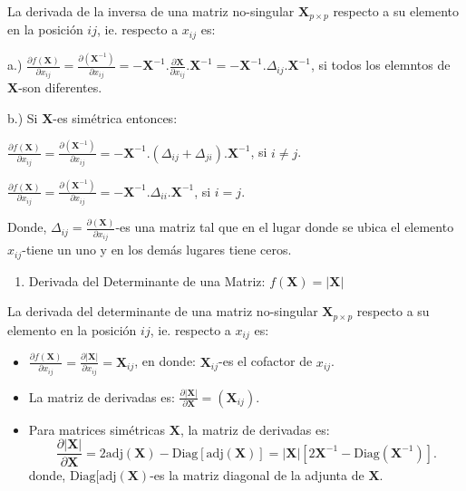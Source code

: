 \documentclass[
]{book}
\providecommand{\tightlist}{%
  \setlength{\itemsep}{0pt}\setlength{\parskip}{0pt}}
\theoremstyle{definition}
\theoremstyle{definition}
\theoremstyle{definition}
\theoremstyle{definition}
\theoremstyle{remark}
\begin{document}
La derivada de la inversa de una matriz no-singular \(\mathbf{X}_{p\times p}\) respecto a su elemento en la posición \(ij\), ie. respecto a \(x_{ij}\) es:

a.) \(\frac{\partial f(\mathbf{X})}{\partial x_{ij}}=\frac{\partial (\mathbf{X}^{-1})}{\partial x_{ij}}=-\mathbf{X}^{-1}.\frac{\partial \mathbf{X}}{\partial x_{ij}}. \mathbf{X}^{-1}=-\mathbf{X}^{-1}.\Delta_{ij}. \mathbf{X}^{-1}\), si todos los elemntos de \(\mathbf{X}\)-son diferentes.

b.) Si \(\mathbf{X}\)-es simétrica entonces:

\(\frac{\partial f(\mathbf{X})}{\partial x_{ij}}=\frac{\partial (\mathbf{X}^{-1})}{\partial x_{ij}}=-\mathbf{X}^{-1}.(\Delta_{ij}+\Delta_{ji}). \mathbf{X}^{-1}\), si \(i\neq j\).

\(\frac{\partial f(\mathbf{X})}{\partial x_{ij}}=\frac{\partial (\mathbf{X}^{-1})}{\partial x_{ij}}=-\mathbf{X}^{-1}.\Delta_{ii}. \mathbf{X}^{-1}\), si \(i= j\).

Donde, \(\Delta_{ij}=\frac{\partial (\mathbf{X})}{\partial x_{ij}}\)-es una matriz tal que en el lugar donde se ubica el elemento \(x_{ij}\)-tiene un uno y en los demás lugares tiene ceros.

\begin{enumerate}
\def\labelenumi{\arabic{enumi}.}
\setcounter{enumi}{4}
\tightlist
\item
  Derivada del Determinante de una Matriz: \(f(\mathbf{X})=|\mathbf{X}|\)\\
\end{enumerate}

La derivada del determinante de una matriz no-singular \(\mathbf{X}_{p\times p}\) respecto a su elemento en la posición \(ij\), ie. respecto a \(x_{ij}\) es:

\begin{itemize}
\item
  \(\frac{\partial f(\mathbf{X})}{\partial x_{ij}}=\frac{\partial |\mathbf{X}|}{\partial x_{ij}}=\mathbf{X}_{ij}\), en donde: \(\mathbf{X}_{ij}\)-es el cofactor de \(x_{ij}\).
\item
  La matriz de derivadas es: \(\frac{\partial |\mathbf{X}|}{\partial \mathbf{X}}=(\mathbf{X}_{ij})\).
\item
  Para matrices simétricas \(\mathbf{X}\), la matriz de derivadas es:
  \[
  \frac{\partial |\mathbf{X}|}{\partial \mathbf{X}}=2 \text{adj}(\mathbf{X})-\text{Diag}[\text{adj}(\mathbf{X})]=|\mathbf{X}
  |[2\mathbf{X}^{-1}-\text{Diag}(\mathbf{X}^{-1})].
  \]
  donde, \(\text{Diag}[\text{adj}(\mathbf{X})\)-es la matriz diagonal de la adjunta de \(\mathbf{X}\).
\end{itemize}
\end{document}
